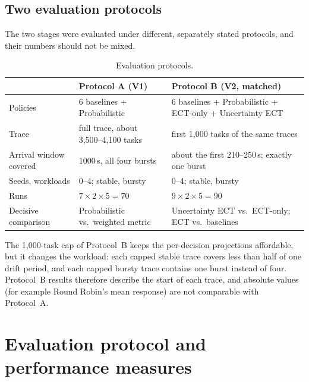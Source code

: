 \documentclass[11pt,a4paper]{article}
\begin{document}
\subsection{Two evaluation protocols}
The two stages were evaluated under different, separately stated protocols, and their numbers should not be
mixed.

\begin{table}[H]
\caption{Evaluation protocols.}\label{tab:protocols}
\begin{tabularx}{\linewidth}{lYY}
\toprule
 & \textbf{Protocol A (V1)} & \textbf{Protocol B (V2, matched)}\\
\midrule
Policies & 6 baselines + Probabilistic & 6 baselines + Probabilistic + ECT-only + Uncertainty ECT\\
Trace & full trace, about 3,500--4,100 tasks & first 1,000 tasks of the same traces\\
Arrival window covered & 1000\,s, all four bursts & about the first 210--250\,s; exactly one burst\\
Seeds, workloads & 0--4; stable, bursty & 0--4; stable, bursty\\
Runs & $7\times2\times5 = 70$ & $9\times2\times5 = 90$\\
Decisive comparison & Probabilistic vs.\ weighted metric & Uncertainty ECT vs.\ ECT-only; ECT vs.\ baselines\\
\bottomrule
\end{tabularx}
\end{table}

The 1,000-task cap of Protocol~B keeps the per-decision projections affordable, but it changes the workload:
each capped stable trace covers less than half of one drift period, and each capped bursty trace contains one
burst instead of four. Protocol~B results therefore describe the start of each trace, and absolute values
(for example Round Robin's mean response) are not comparable with Protocol~A.

\section{Evaluation protocol and performance measures}
\end{document}
